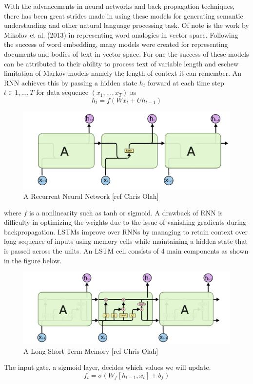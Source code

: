 \documentclass[11pt]{article}
\begin{document}
With the advancements in neural networks and back propagation techniques,
there has been great strides made in using these models for generating 
semantic understanding and other natural language processing task. Of note
is the work by Mikolov et al. (2013) in representing word analogies in
vector space. Following the success of word embedding, many models were
created for representing documents and bodies of text in vector space. For
one the success of these models can be attributed to their ability to 
process text of variable length and eschew limitation of Markov models namely
the length of context it can remember. An RNN achieves this by passing
a hidden state $h_t$ forward at each time step $t \in {1,...,T}$ for data 
sequence $(x_1,...,x_T)$ as
\[ h_t = f(Wx_t + Uh_{t-1} ) \]
\begin{figure}
\includegraphics[width=\linewidth]{olahrnn.png}
\caption{A Recurrent Neural Network [ref Chris Olah]}
\end{figure}
where $f$ is a nonlinearity such as tanh or sigmoid.
A drawback of RNN is difficulty in optimizing the weights due to the
issue of vanishing gradients during backpropagation. LSTMs improve over
RNNs by managing to retain context over long sequence of inputs using
memory cells while maintaining a hidden state that is passed across the
units. An LSTM cell consists of 4 main components as shown in the figure 
below.
\begin{figure}
  \includegraphics[width=\linewidth]{olahlstm.png}
  \caption{A Long Short Term Memory [ref Chris Olah]}
  \label{fig:lstm}
\end{figure}
The input gate, a sigmoid layer, decides which values we will update.
\[ f_t = \sigma(W_f[h_{t-1}, x_t] + b_f)\]
\end{document}
